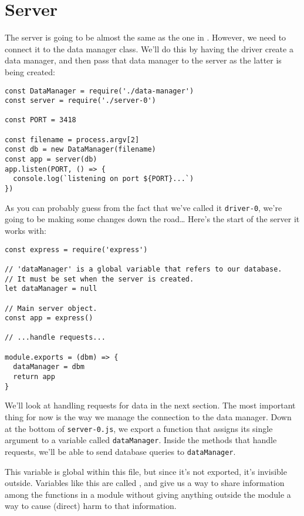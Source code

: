 \section{Server}\label{s:capstone-server}

The server is going to be almost the same as the one in .
However, we need to connect it to the data manager class.
We'll do this by having the driver create a data manager,
and then pass that data manager to the server as the latter is being created:

\begin{verbatim}
const DataManager = require('./data-manager')
const server = require('./server-0')

const PORT = 3418

const filename = process.argv[2]
const db = new DataManager(filename)
const app = server(db)
app.listen(PORT, () => {
  console.log(`listening on port ${PORT}...`)
})
\end{verbatim}

\noindent
As you can probably guess from the fact that we've called it \texttt{driver-0},
we're going to be making some changes down the road{\ldots}
Here's the start of the server it works with:

\begin{verbatim}
const express = require('express')

// 'dataManager' is a global variable that refers to our database.
// It must be set when the server is created.
let dataManager = null

// Main server object.
const app = express()

// ...handle requests...

module.exports = (dbm) => {
  dataManager = dbm
  return app
}
\end{verbatim}

We'll look at handling requests for data in the next section.
The most important thing for now is the way we manage the connection to the data manager.
Down at the bottom of \texttt{server-0.js},
we export a function that assigns its single argument to a variable called \texttt{dataManager}.
Inside the methods that handle requests,
we'll be able to send database queries to \texttt{dataManager}.

This variable is global within this file,
but since it's not exported,
it's invisible outside.
Variables like this are called ,
and give us a way to share information among the functions in a module
without giving anything outside the module a way to cause (direct) harm to that information.

